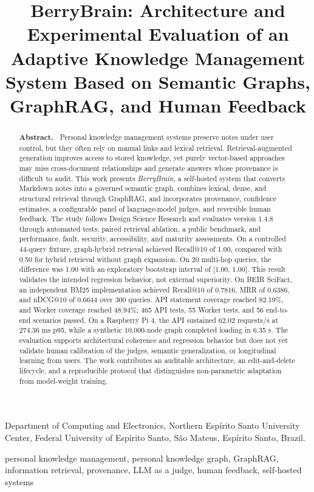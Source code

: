 \documentclass{sbc2023}
\title[BerryBrain: Architecture and Experimental Evaluation]{BerryBrain: Architecture and Experimental Evaluation of an Adaptive Knowledge Management System Based on Semantic Graphs, GraphRAG, and Human Feedback}
\author[Souza and Silvestre 2026]{
\affil{\textbf{Mateus Almeida de Souza}~\href{https://orcid.org/0009-0000-4701-1282}{\textcolor{orcidlogo}{\aiOrcid}}~\textcolor{blue}{\faEnvelopeO}~~[~\textbf{UFES/CEUNES, São Mateus, Brazil}~|~\href{mailto:mateus.a.souza@edu.ufes.br}{\textbf{\textit{mateus.a.souza@edu.ufes.br}}}~]}
\affil{\textbf{Leonardo José Silvestre}~\textcolor{blue}{\faEnvelopeO}~~[~\textbf{UFES/CEUNES, São Mateus, Brazil}~|~\href{mailto:leonardo.silvestre@ufes.br}{\textbf{\textit{leonardo.silvestre@ufes.br}}}~]}
}
\newcommand{\BerryBrain}{\textit{BerryBrain}}
\begin{document}
\begin{frontmatter}
\maketitle

\begin{mail}
Department of Computing and Electronics, Northern Espírito Santo University Center,
Federal University of Espírito Santo, São Mateus, Espírito Santo, Brazil.
\end{mail}

\begin{abstract}
\textbf{Abstract.~}
Personal knowledge management systems preserve notes under user control, but they often rely on
manual links and lexical retrieval. Retrieval-augmented generation improves access to stored
knowledge, yet purely vector-based approaches may miss cross-document relationships and generate
answers whose provenance is difficult to audit. This work presents \BerryBrain, a self-hosted
system that converts Markdown notes into a governed semantic graph, combines lexical, dense, and
structural retrieval through GraphRAG, and incorporates provenance, confidence estimates, a
configurable panel of language-model judges, and reversible human feedback. The study follows
Design Science Research and evaluates version 1.4.8 through automated tests, paired retrieval
ablation, a public benchmark, and performance, fault, security, accessibility, and maturity
assessments. On a controlled 44-query fixture, graph-hybrid retrieval achieved Recall@10 of 1.00,
compared with 0.50 for hybrid retrieval without graph expansion. On 20 multi-hop queries, the
difference was 1.00 with an exploratory bootstrap interval of [1.00, 1.00]. This result validates
the intended regression behavior, not external superiority. On BEIR SciFact, an independent BM25
implementation achieved Recall@10 of 0.7816, MRR of 0.6386, and nDCG@10 of 0.6644 over 300
queries. API statement coverage reached 82.19\%, and Worker coverage reached 48.94\%; 465 API
tests, 55 Worker tests, and 56 end-to-end scenarios passed. On a Raspberry Pi 4, the API sustained
62.02 requests/s at 274.36 ms p95, while a synthetic 10,000-node graph completed loading in
6.35 s. The
evaluation supports architectural coherence and regression behavior but does not yet validate
human calibration of the judges, semantic generalization, or longitudinal learning from users.
The work contributes an auditable architecture, an edit-and-delete lifecycle, and a reproducible
protocol that distinguishes non-parametric adaptation from model-weight training.
\end{abstract}

\begin{keywords}
personal knowledge management, personal knowledge graph, GraphRAG, information retrieval,
provenance, LLM as a judge, human feedback, self-hosted systems
\end{keywords}

\end{frontmatter}
\end{document}
